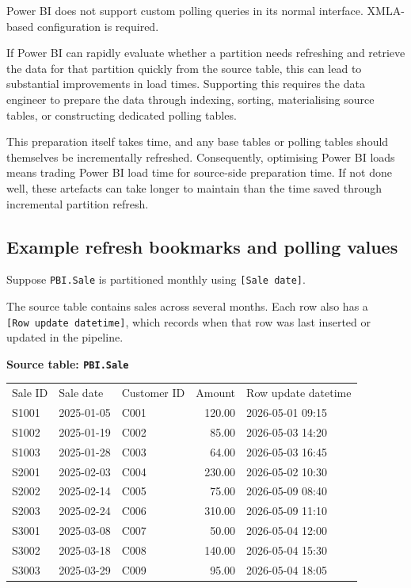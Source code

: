 \documentclass[10pt,openany,10pt]{book}
\newcounter{none}
\let\podeToprule\toprule
\let\podeMidrule\midrule
\let\podeBottomrule\bottomrule
\renewcommand{\toprule}{\arrayrulecolor{pbiGrid}\podeToprule}
\renewcommand{\midrule}{\arrayrulecolor{pbiGrid}\podeMidrule}
\renewcommand{\bottomrule}{\arrayrulecolor{pbiGrid}\podeBottomrule}
\begin{document}
Power BI does not support custom polling queries in its normal
interface. XMLA-based configuration is required.

If Power BI can rapidly evaluate whether a partition needs refreshing
and retrieve the data for that partition quickly from the source table,
this can lead to substantial improvements in load times. Supporting this
requires the data engineer to prepare the data through indexing,
sorting, materialising source tables, or constructing dedicated polling
tables.

This preparation itself takes time, and any base tables or polling
tables should themselves be incrementally refreshed. Consequently,
optimising Power BI loads means trading Power BI load time for
source-side preparation time. If not done well, these artefacts can take
longer to maintain than the time saved through incremental partition
refresh.

\subsection{Example refresh bookmarks and polling
values}\label{example-refresh-bookmarks-and-polling-values}

Suppose \texttt{PBI.Sale} is partitioned monthly using
\texttt{{[}Sale\ date{]}}.

The source table contains sales across several months. Each row also has
a \texttt{{[}Row\ update\ datetime{]}}, which records when that row was
last inserted or updated in the pipeline.

\textbf{Source table: \texttt{PBI.Sale}}

{\def\LTcaptype{none} %
\begin{longtable}[]{@{}lllrl@{}}
\toprule\noalign{}
Sale ID & Sale date & Customer ID & Amount & Row update datetime \\
\midrule\noalign{}
\endhead
\bottomrule\noalign{}
\endlastfoot
S1001 & 2025-01-05 & C001 & 120.00 & 2026-05-01 09:15 \\
S1002 & 2025-01-19 & C002 & 85.00 & 2026-05-03 14:20 \\
S1003 & 2025-01-28 & C003 & 64.00 & 2026-05-03 16:45 \\
S2001 & 2025-02-03 & C004 & 230.00 & 2026-05-02 10:30 \\
S2002 & 2025-02-14 & C005 & 75.00 & 2026-05-09 08:40 \\
S2003 & 2025-02-24 & C006 & 310.00 & 2026-05-09 11:10 \\
S3001 & 2025-03-08 & C007 & 50.00 & 2026-05-04 12:00 \\
S3002 & 2025-03-18 & C008 & 140.00 & 2026-05-04 15:30 \\
S3003 & 2025-03-29 & C009 & 95.00 & 2026-05-04 18:05 \\
\end{longtable}
}
\end{document}
